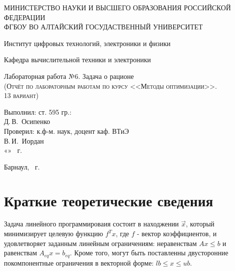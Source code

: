 \documentclass[a4paper, 12pt]{article}
\begin{document}
\begin{titlepage}
  \begin{center}
    \MakeUppercase{Министерство науки и высшего образования Российской Федерации} \\
    \MakeUppercase{ФГБОУ ВО Алтайский госудаственный университет}
    \vspace{0.25cm}
    
	  Институт цифровых технологий, электроники и физики
    
    Кафедра вычислительной техники и электроники
    \vfill
    
    {\LARGE Лабораторная работа №6. Задача о рационе}\\[5mm]
    \textsc{(Отчёт по лабораторным работам по курсу <<Методы оптимизации>>. \\13 вариант)}
  \bigskip

\end{center}
\vfill

\newlength{\ML}
\hfill
\begin{minipage}{0.45\textwidth}
  Выполнил: ст. 595 гр.:\\
  \underline{\hspace{\ML}} Д.\,В.~Осипенко\\
  Проверил: к.ф-м. наук, доцент каф. ВТиЭ\\
  \underline{\hspace{\ML}} В.\,И.~Иордан\\
  «\underline{\hspace{0.7cm}}» \underline{\hspace{2cm}} \the\year~г.
\end{minipage}%
\vfill

\begin{center}
  Барнаул, \the\year~г.
\end{center}
\end{titlepage}

\newpage
\section{Краткие теоретические сведения}
Задача линейного программироваия состоит в находжении $\vec{x}$, который минимизирует целевую функцию $f^Tx$, где $f$ - вектор коэффициентов, и удовлетворяет заданным линейным ограничениям: неравенствам $Ax\leq b$ и равенствам $A_{eq}x = b_{eq}$. Кроме того, могут быть поставленны двусторонние покомпонентные ограничения в векторной форме: $lb\leq x \leq ub$.
\end{document}

